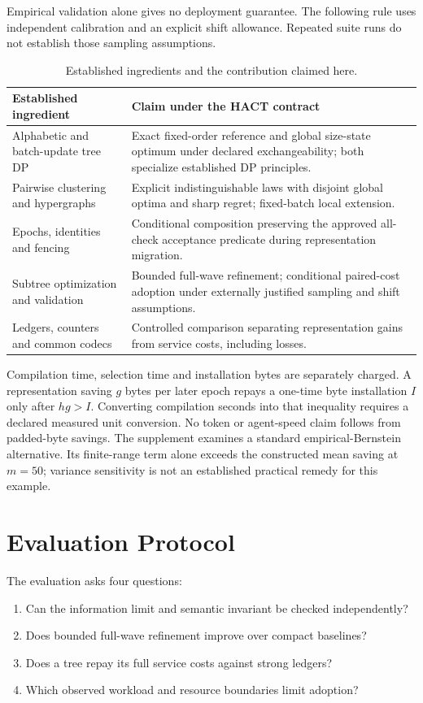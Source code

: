 \documentclass[10pt,journal,compsoc]{IEEEtran}
\theoremstyle{definition}\newtheorem{definition}[theorem]{Definition}
\begin{document}
Empirical validation alone gives no deployment guarantee. The following
rule uses independent calibration and an explicit shift allowance.
Repeated suite runs do not establish those sampling assumptions.



\begin{table}[t]\centering\footnotesize
\caption{Established ingredients and the contribution claimed here.}
\label{tab:novelty}
\begin{tabularx}{\columnwidth}{@{}p{}X@{}}\toprule
Established ingredient & Claim under the HACT contract\\\midrule
Alphabetic and batch-update tree DP & Exact fixed-order reference and global size-state optimum under declared exchangeability; both specialize established DP principles.\\
Pairwise clustering and hypergraphs & Explicit indistinguishable laws with disjoint global optima and sharp regret; fixed-batch local extension.\\
Epochs, identities and fencing & Conditional composition preserving the approved all-check acceptance predicate during representation migration.\\
Subtree optimization and validation & Bounded full-wave refinement; conditional paired-cost adoption under externally justified sampling and shift assumptions.\\
Ledgers, counters and common codecs & Controlled comparison separating representation gains from service costs, including losses.\\\bottomrule
\end{tabularx}
\end{table}

Compilation time, selection time and installation bytes are separately
charged. A representation saving $g$ bytes per later epoch repays a one-time
byte installation $I$ only after $h g>I$. Converting compilation seconds into
that inequality requires a declared measured unit conversion. No token
or agent-speed claim follows from padded-byte savings.
The supplement examines a standard empirical-Bernstein alternative. Its
finite-range term alone exceeds the constructed mean saving at $m=50$;
variance sensitivity is not an established practical remedy for this example.

\section{Evaluation Protocol}\label{sec:jevaluation}
The evaluation asks four questions:
\begin{enumerate}
\item Can the information limit and semantic invariant be checked independently?
\item Does bounded full-wave refinement improve over compact baselines?
\item Does a tree repay its full service costs against strong ledgers?
\item Which observed workload and resource boundaries limit adoption?
\end{enumerate}
\end{document}
